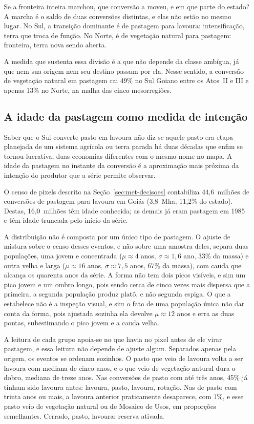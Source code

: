 Se a fronteira inteira marchou, que conversão a moveu, e em que parte do
estado? A marcha é o saldo de duas conversões distintas, e elas não estão no
mesmo lugar. No Sul, a transição dominante é de pastagem para lavoura:
intensificação, terra que troca de função. No Norte, é de vegetação natural
para pastagem: fronteira, terra nova sendo aberta.

A medida que sustenta essa divisão é a que não depende da classe ambígua, já que nem
sua origem nem seu destino passam por ela. Nesse sentido, a conversão de
vegetação natural em pastagem cai 49\% no Sul Goiano entre os Atos~II e III e
apenas 13\% no Norte, na malha das cinco mesorregiões.

\subsection{A idade da pastagem como medida de intenção}

Saber que o Sul converte pasto em lavoura não diz se aquele pasto era etapa
planejada de um sistema agrícola ou terra parada há duas décadas que enfim se
tornou lucrativa, duas economias diferentes com o mesmo nome no mapa. A
idade da pastagem no instante da conversão é a aproximação mais próxima da
intenção do produtor que a série permite observar.

O censo de pixels descrito na Seção~\ref{sec:met-decisoes} contabiliza
44,6~milhões de conversões de pastagem para lavoura em Goiás (3,8~Mha,
11,2\% do estado). Destas, 16,0~milhões têm idade conhecida; as demais já
eram pastagem em 1985 e têm idade truncada pelo início da série.

A distribuição não é composta por um único tipo de pastagem. O ajuste de
mistura sobre o censo desses eventos, e não sobre uma amostra deles, separa
duas populações, uma jovem e concentrada ($\mu \approx 4$ anos,
$\sigma \approx 1{,}6$ ano, 33\% da massa) e outra
velha e larga ($\mu \approx 16$ anos, $\sigma \approx 7{,}5$ anos, 67\% da
massa), com cauda que alcança os quarenta anos da série. A forma não tem dois
picos visíveis, e sim um pico jovem e um ombro longo, pois sendo cerca de cinco vezes
mais dispersa que a primeira, a segunda população produz platô, e não segunda
espiga. O que a estabelece não é a inspeção visual, e sim o fato de uma
população única não dar conta da forma, pois ajustada sozinha ela devolve $\mu
\approx 12$ anos e erra as duas pontas, subestimando o pico jovem e a cauda
velha.

A leitura de cada grupo apoia-se no que havia no pixel antes de ele virar
pastagem, e essa leitura não depende de ajuste algum. Separados apenas
pela origem, os eventos se ordenam sozinhos. O pasto que veio de lavoura
volta a ser lavoura com mediana de cinco anos, e o que veio de vegetação
natural dura o dobro, mediana de treze anos. Nas conversões de pasto com até
três anos, 45\% já tinham sido lavoura antes: lavoura, pasto, lavoura,
rotação. Nas de pasto com trinta anos ou mais, a lavoura anterior
praticamente desaparece, com 1\%, e esse pasto veio de vegetação natural ou de
Mosaico de Usos, em proporções semelhantes. Cerrado, pasto, lavoura:
reserva ativada.

